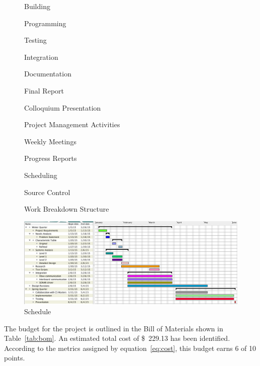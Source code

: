 \documentclass{article}
\begin{document}
\begin{figure}[htb]
\begin{framed}
\begin{enumerate*}
\begin{enumerate*}
                    \begin{enumerate*}
                        \item Building
                        \item Programming
                        \item Testing
                        \item Integration
                        \item Documentation
                    \end{enumerate*}
                \end{enumerate*}
                \item Final Report
                \item Colloquium Presentation
                \item Project Management Activities
                \begin{enumerate*}
                    \item Weekly Meetings
                    \item Progress Reports
                    \item Scheduling
                    \item Source Control
                \end{enumerate*}
            \end{enumerate*}
            \end{framed}
            \caption{Work Breakdown Structure}
            \label{fig:work_breakdown_structure}
        \end{figure}

        \begin{figure}
            \centering
            \includegraphics[width=\textwidth]{gantt.png}
            \caption{Schedule}
            \label{fig:gantt}
        \end{figure}

        The budget for the project is outlined in the Bill of Materials
        shown in Table~\ref{tab:bom}.
        An estimated total cost of \SI{229.13}[\$]{} has been identified.
        According to the metrics assigned by equation~\ref{eq:cost},
        this budget earns 6 of 10 points.
\end{document}
